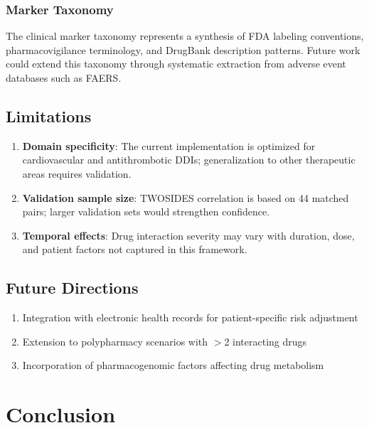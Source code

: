 \documentclass[11pt,a4paper]{article}
\begin{document}
\subsubsection{Marker Taxonomy}

The clinical marker taxonomy represents a synthesis of FDA labeling conventions, pharmacovigilance terminology, and DrugBank description patterns. Future work could extend this taxonomy through systematic extraction from adverse event databases such as FAERS.

\subsection{Limitations}

\begin{enumerate}
    \item \textbf{Domain specificity}: The current implementation is optimized for cardiovascular and antithrombotic DDIs; generalization to other therapeutic areas requires validation.
    \item \textbf{Validation sample size}: TWOSIDES correlation is based on 44 matched pairs; larger validation sets would strengthen confidence.
    \item \textbf{Temporal effects}: Drug interaction severity may vary with duration, dose, and patient factors not captured in this framework.
\end{enumerate}

\subsection{Future Directions}

\begin{enumerate}
    \item Integration with electronic health records for patient-specific risk adjustment
    \item Extension to polypharmacy scenarios with $>$2 interacting drugs
    \item Incorporation of pharmacogenomic factors affecting drug metabolism
\end{enumerate}

\section{Conclusion}
\end{document}
